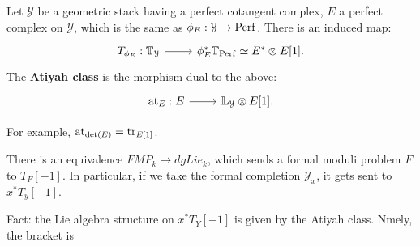 \begin{defin}
Let $\mathcal{Y}$ be a geometric stack having a perfect cotangent complex, $E$ a perfect complex on $\mathcal{Y}$,
which is the same as $\phi_E : \mathcal{Y} \to \mathrm{Perf}$. There is an induced map:
\[
\begin{tikzcd}
T_{\phi_E} : \bbT_{\mathcal{Y}} \arrow{r} & \phi_E^* \bbT_{\Perf} \simeq E^* \otimes E[1].
\end{tikzcd}
\]
The \textbf{Atiyah class} is the morphism dual to the above:
\[
\begin{tikzcd}
\at_E : E \arrow{r} & \bbL_{\mathcal{Y}} \otimes E[1].
\end{tikzcd}
\]
\end{defin}

For example, $\operatorname{at}_{\det(E)} = \operatorname{tr}_{E[1]}$.


\begin{thm}
There is an equivalence $FMP_k \to dgLie_k$, which sends a formal moduli problem $F$ to $T_F[-1]$. In particular, if we
take the formal completion $\mathcal{Y}_x$, it gets sent to $x^* T_y[-1]$.
\end{thm}

Fact: the Lie algebra structure on $x^* T_Y[-1]$ is given by the Atiyah class. Nmely, the bracket is 

